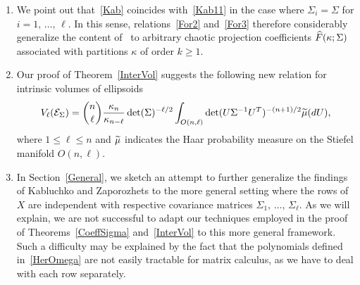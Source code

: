 \documentclass[AHL,Unicode,longabstracts,published]{cedram}
\newcommand{\clE}{\mathcal{E}}
\newcommand*{\alphenumi}{\renewcommand*{\theenumi}{\alph{enumi}}}
\let\oldtilde\tilde
\renewcommand*{\tilde}[1]{\mathchoice{\widetilde{#1}}{\widetilde{#1}}{\oldtilde{#1}}{\oldtilde{#1}}}
\let\oldhat\hat
\renewcommand*{\hat}[1]{\mathchoice{\widehat{#1}}{\widehat{#1}}{\oldhat{#1}}{\oldhat{#1}}}
\begin{document}
\begin{rema}\leavevmode
\begin{enumerate}\alphenumi
\item We point out that~\eqref{Kab} coincides with~\eqref{Kab11} in the case where $\Sigma_i=\Sigma$ for $i=1,\,\ldots,\,\ell$. In this sense, relations~\eqref{For2} and~\eqref{For3} therefore considerably generalize the content of~\cite[Theorem~1.1]{Kab14} to arbitrary chaotic projection coefficients $\hat{F}(\kappa;\Sigma)$ associated with partitions $\kappa$ of order $k \geq 1$.
\item Our proof of Theorem~\ref{InterVol} suggests the following new relation for intrinsic volumes of ellipsoids
\begin{gather*}
V_{\ell}(\clE_{\Sigma})= \binom{n}{\ell}\frac{\kappa_n}{\kappa_{n-\ell}}\det(\Sigma)^{-\ell/2}
\int_{O(n,\ell)} \det(U\Sigma^{-1}U^T)^{-(n+1)/2} \tilde{\mu}(dU),
\end{gather*}
where $1\leq \ell \leq n$ and $\tilde{\mu}$ indicates the Haar probability measure on the Stiefel manifold $O(n,\ell)$.
\item In Section~\ref{General}, we sketch an attempt to further generalize the findings of Kabluchko and Zaporozhets to the more general setting where the rows of $X$ are independent with respective covariance matrices $\Sigma_1,\,\ldots,\,\Sigma_{\ell}$. As we will explain, we are not successful to adapt our techniques employed in the proof of Theorems~\ref{CoeffSigma} and~\ref{InterVol} to this more general framework. Such a difficulty may be explained by the fact that the polynomials defined in~\eqref{HerOmega} are not easily tractable for matrix calculus, as we have to deal with each row separately.
\end{enumerate}
\end{rema}
\end{document}
